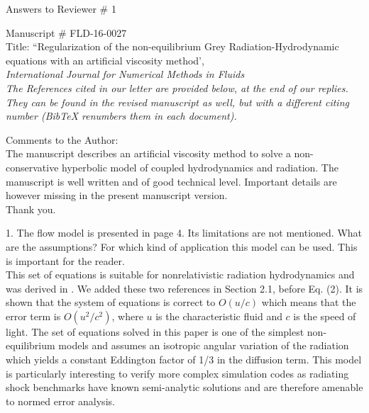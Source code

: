 \documentclass{article}
\begin{document}
\begin{center}
{ \Large Answers to Reviewer \# 1}
\end{center}

\bigskip

\noindent Manuscript \# FLD-16-0027 \\
Title: ``Regularization of the non-equilibrium Grey Radiation-Hydrodynamic equations with an artificial viscosity method', \\
{\it International Journal for Numerical Methods in Fluids}\\

\bigskip
{\it The References cited in our letter are provided below, at the end of our replies. They can be found in the revised manuscript as well,
but with a different citing number (BibTeX renumbers them in each document).}
\bigskip

{\color{blue}
Comments to the Author: \\ 
The manuscript describes an artificial viscosity method to solve a non-conservative hyperbolic model of coupled hydrodynamics and radiation. The manuscript is well written and of good technical level.
Important details are however missing in the present manuscript version.\\}
Thank you.
\bigskip

{\color{blue}
1. The flow model is presented in page 4. Its limitations are not mentioned. What are the assumptions? For which kind of application this model can be used. This is important for the reader. \\}
This set of equations is suitable for nonrelativistic radiation hydrodynamics and was derived in \cite{LowrieMorelHittinger, LowrieMorel}. 
We added these two references in Section 2.1, before Eq. (2). 
It is shown that the system of equations is correct to $O(u/c)$ which means that the error term is $O(u^2/c^2)$, where $u$ is the characteristic fluid and $c$ is the speed of light. The set of equations solved in this paper is one of the simplest non-equilibrium models and assumes an isotropic angular variation of the radiation which yields a constant Eddington factor of 1/3 in the diffusion term. This model is particularly interesting to verify more complex simulation codes as radiating shock benchmarks have known semi-analytic solutions and are therefore amenable to normed error analysis. 
\bigskip
\end{document}
